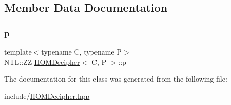 \subsection{Member Data Documentation}
\mbox{\label{classHOMDecipher_a434f26bd73b3f9ee8bf999278d78a26c}} 
\subsubsection{\texorpdfstring{p}{p}}
{\footnotesize\ttfamily template$<$typename C, typename P$>$ \\
N\+T\+L\+::\+ZZ \hyperlink{classHOMDecipher}{H\+O\+M\+Decipher}$<$ C, P $>$\+::p\hspace{0.3cm}{\ttfamily [protected]}}



The documentation for this class was generated from the following file\+:\begin{DoxyCompactItemize}
\item 
include/\hyperlink{HOMDecipher_8hpp}{H\+O\+M\+Decipher.\+hpp}\end{DoxyCompactItemize}
